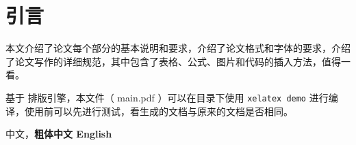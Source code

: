 \chapter{引言}
\label{chap:references}
本文介绍了论文每个部分的基本说明和要求，介绍了论文格式和字体的要求，介绍了论文写作的详细规范，其中包含了表格、公式、图片和代码的插入方法，值得一看。

基于 \LaTeXe 排版引擎，本文件（ main.pdf ）可以在目录下使用 \lstinline|xelatex demo| 进行编译，使用前可以先进行测试，看生成的文档与原来的文档是否相同。

中文，{\bfseries 粗体中文 English}